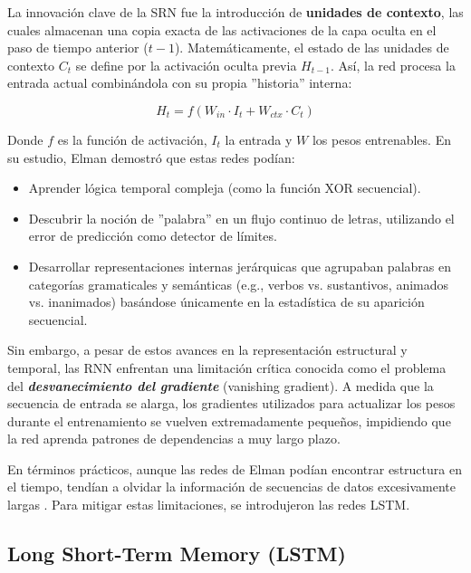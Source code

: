\documentclass[11pt, a4paper]{article}
\begin{document}
La innovación clave de la SRN fue la introducción de \textbf{unidades de contexto}, las cuales almacenan una copia exacta de las activaciones de la capa oculta en el paso de tiempo
anterior ($t-1$). Matemáticamente, el estado de las unidades de contexto $C_t$ se define por la activación oculta previa $H_{t-1}$. Así, la red procesa la entrada actual combinándola
con su propia ''historia'' interna:

\begin{equation}
    H_t = f(W_{in} \cdot I_t + W_{ctx} \cdot C_t)
\end{equation}

Donde $f$ es la función de activación, $I_t$ la entrada y $W$ los pesos entrenables. En su estudio, Elman demostró que estas redes podían:
\begin{itemize}
    \item Aprender lógica temporal compleja (como la función XOR secuencial).
    \item Descubrir la noción de ''palabra'' en un flujo continuo de letras, utilizando el error de predicción como detector de límites.
    \item Desarrollar representaciones internas jerárquicas que agrupaban palabras en categorías gramaticales y semánticas (e.g., verbos vs. sustantivos, animados vs. inanimados) 
    basándose únicamente en la estadística de su aparición secuencial.
\end{itemize}

Sin embargo, a pesar de estos avances en la representación estructural y temporal, las RNN enfrentan una limitación crítica conocida como el problema del 
\textit{\textbf{desvanecimiento del gradiente}} (vanishing gradient). A medida que la secuencia de entrada se alarga, los gradientes utilizados para actualizar los pesos durante 
el entrenamiento se vuelven extremadamente pequeños, impidiendo que la red aprenda patrones de dependencias a muy largo plazo.

En términos prácticos, aunque las redes de Elman podían encontrar estructura en el tiempo, tendían a olvidar la información de secuencias de datos excesivamente largas 
\parencite{atkinson2025}. Para mitigar estas limitaciones, se introdujeron las redes LSTM.

\subsection{Long Short-Term Memory (LSTM)}
\end{document}
